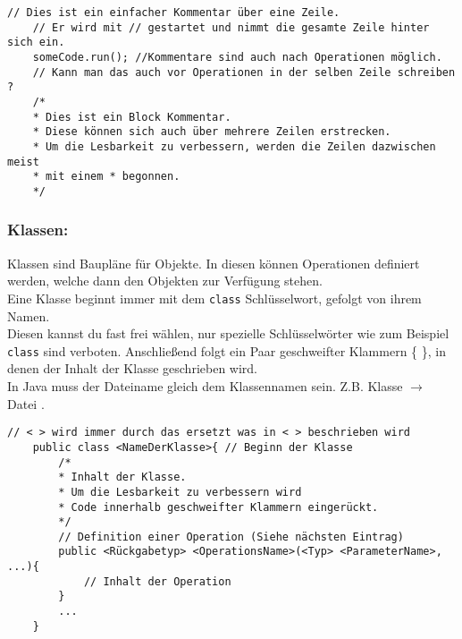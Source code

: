\begin{lstlisting}[title=\textbf{Kommentar Beispiel}]
	// Dies ist ein einfacher Kommentar über eine Zeile.
	// Er wird mit // gestartet und nimmt die gesamte Zeile hinter sich ein.
	someCode.run(); //Kommentare sind auch nach Operationen möglich.
	// Kann man das auch vor Operationen in der selben Zeile schreiben ?
	/*
	* Dies ist ein Block Kommentar.
	* Diese können sich auch über mehrere Zeilen erstrecken.
	* Um die Lesbarkeit zu verbessern, werden die Zeilen dazwischen meist
	* mit einem * begonnen.
	*/
\end{lstlisting}
\lstset{
	basicstyle=\small
}
\begin{Infobox}

	\subsubsection*{Klassen:}
	Klassen sind Baupläne für Objekte.
	In diesen können Operationen definiert werden, welche dann den Objekten zur Verfügung stehen.\\
	Eine Klasse beginnt immer mit dem \lstinline{class} Schlüsselwort, gefolgt von ihrem Namen.\\
	Diesen kannst du fast frei wählen, nur spezielle Schlüsselwörter wie zum Beispiel \lstinline{class} sind verboten.
	Anschließend folgt ein Paar geschweifter Klammern \{ \}, in denen der Inhalt der Klasse geschrieben wird.\\
	In Java muss der Dateiname gleich dem Klassennamen sein. Z.B. Klasse  $\rightarrow$ Datei .
\end{Infobox}


\begin{lstlisting}[title=\textbf{Klassen Syntax}]
	// < > wird immer durch das ersetzt was in < > beschrieben wird
	public class <NameDerKlasse>{ // Beginn der Klasse
		/*
		* Inhalt der Klasse.
		* Um die Lesbarkeit zu verbessern wird
		* Code innerhalb geschweifter Klammern eingerückt.
		*/
		// Definition einer Operation (Siehe nächsten Eintrag)
		public <Rückgabetyp> <OperationsName>(<Typ> <ParameterName>, ...){
			// Inhalt der Operation
		}
		...
	}
\end{lstlisting}

